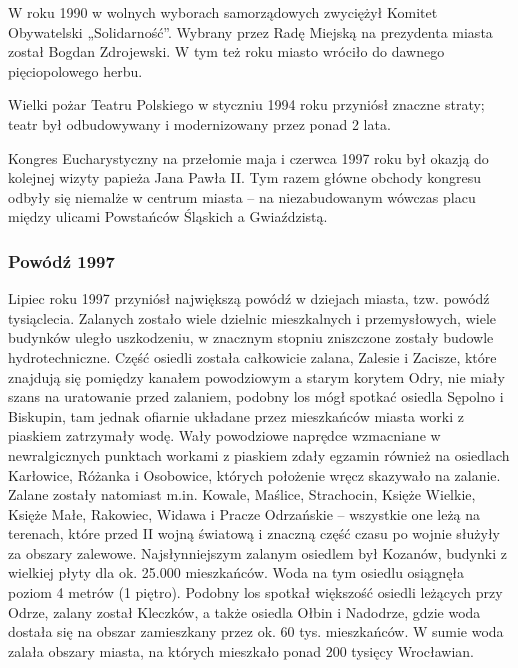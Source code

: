 \documentclass{article}
\begin{document}
W roku 1990 w wolnych wyborach samorządowych zwyciężył Komitet Obywatelski „Solidarność”. Wybrany przez Radę Miejską na prezydenta miasta został Bogdan Zdrojewski. W tym też roku miasto wróciło do dawnego pięciopolowego herbu.

Wielki pożar Teatru Polskiego w styczniu 1994 roku przyniósł znaczne straty; teatr był odbudowywany i modernizowany przez ponad 2 lata.

Kongres Eucharystyczny na przełomie maja i czerwca 1997 roku był okazją do kolejnej wizyty papieża Jana Pawła II. Tym razem główne obchody kongresu odbyły się niemalże w centrum miasta – na niezabudowanym wówczas placu między ulicami Powstańców Śląskich a Gwiaździstą.


\subsubsection {Powódź 1997}

Lipiec roku 1997 przyniósł największą powódź w dziejach miasta, tzw. powódź tysiąclecia. Zalanych zostało wiele dzielnic mieszkalnych i przemysłowych, wiele budynków uległo uszkodzeniu, w znacznym stopniu zniszczone zostały budowle hydrotechniczne. Część osiedli została całkowicie zalana, Zalesie i Zacisze, które znajdują się pomiędzy kanałem powodziowym a starym korytem Odry, nie miały szans na uratowanie przed zalaniem, podobny los mógł spotkać osiedla Sępolno i Biskupin, tam jednak ofiarnie układane przez mieszkańców miasta worki z piaskiem zatrzymały wodę. Wały powodziowe naprędce wzmacniane w newralgicznych punktach workami z piaskiem zdały egzamin również na osiedlach Karłowice, Różanka i Osobowice, których położenie wręcz skazywało na zalanie. Zalane zostały natomiast m.in. Kowale, Maślice, Strachocin, Księże Wielkie, Księże Małe, Rakowiec, Widawa i Pracze Odrzańskie – wszystkie one leżą na terenach, które przed II wojną światową i znaczną część czasu po wojnie służyły za obszary zalewowe. Najsłynniejszym zalanym osiedlem był Kozanów, budynki z wielkiej płyty dla ok. 25.000 mieszkańców. Woda na tym osiedlu osiągnęła poziom 4 metrów (1 piętro). Podobny los spotkał większość osiedli leżących przy Odrze, zalany został Kleczków, a także osiedla Ołbin i Nadodrze, gdzie woda dostała się na obszar zamieszkany przez ok. 60 tys. mieszkańców. W sumie woda zalała obszary miasta, na których mieszkało ponad 200 tysięcy Wrocławian.
\end{document}

